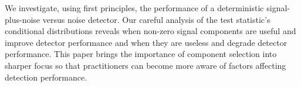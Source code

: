 We investigate, using first principles, the performance of a deterministic
signal-plus-noise versus noise detector. Our careful analysis of the test statistic's
conditional distributions reveals when non-zero signal components are useful and improve
detector performance and when they are useless and degrade detector performance. This
paper brings the importance of component selection into sharper focus so that
practitioners can become more aware of factors affecting detection performance.